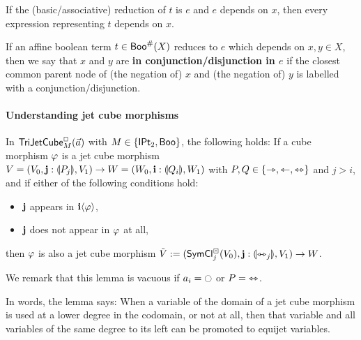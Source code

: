 \documentclass[a4paper]{memoir}
\begin{document}
\begin{corollary} \label{thm:reduction-minimal-deps}
	If the (basic/associative) reduction of $t$ is $e$ and $e$ depends on $x$, then every expression representing $t$ depends on $x$. \qedhere
\end{corollary}
\begin{definition} \label{def:in-connection}
	If an affine boolean term $t \in \mathsf{Boo}^\#(X)$ reduces to $e$ which depends on $x, y \in X$, then we say that $x$ and $y$ are \textbf{in conjunction/disjunction in $e$} if the closest common parent node of (the negation of) $x$ and (the negation of) $y$ is labelled with a conjunction/disjunction.
\end{definition}

\paragraph{Understanding jet cube morphisms}
\begin{lemma} \label{thm:left-of-concursor}
	In $\mathsf{TriJetCube}^{\Box}_{M}\mathopen{}\left( \vec a \right)\mathclose{}$ with $M \in \mathopen{}\left\{ {\mathsf{IPt}_2}, \mathsf{Boo} \right\}\mathclose{}$,
	the following holds:
	If a cube morphism $\varphi$ is a jet cube morphism $V = (V_0, \mathbf{j} : {\llparenthesis P_j \rrparenthesis}, V_1) \to W = (W_0, \mathbf{i} : {\llparenthesis Q_i \rrparenthesis}, W_1)$ with $P, Q \in \mathopen{}\left\{ \rightarrowtriangle, \leftarrowtriangle, \leftrightarrowtriangle \right\}\mathclose{}$ and $j > i$,
	and if either of the following conditions hold:
	\begin{itemize}
		\item $\mathbf{j}$ appears in $\mathbf{i} \langle \varphi \rangle$,
		\item $\mathbf{j}$ does not appear in $\varphi$ at all,
	\end{itemize}
	then $\varphi$ is also a jet cube morphism
	$\tilde V := (\mathsf{SymCl}^\boxdot_j(V_0), \mathbf{j} : {\llparenthesis \leftrightarrowtriangle_j \rrparenthesis}, V_1) \to W$.
\end{lemma}
We remark that this lemma is vacuous if $a_i = \npolar$ or $P = {\leftrightarrowtriangle}$.

In words, the lemma says: When a variable of the domain of a jet cube morphism is used at a lower degree in the codomain, or not at all, then that variable and all variables of the same degree to its left can be promoted to equijet variables.
\end{document}

